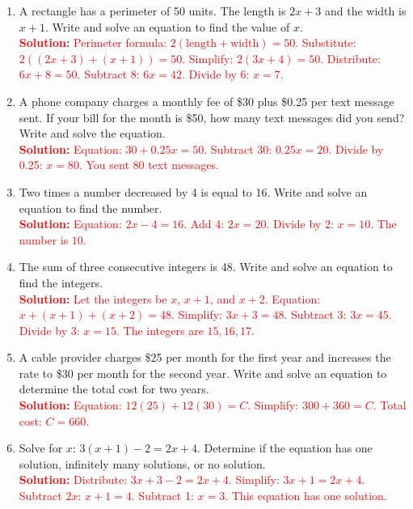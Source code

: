 \documentclass[11pt]{article}
\begin{document}
\begin{tcolorbox}[colframe=black!60, colback=white, 
coltitle=black, colbacktitle=black!15, fonttitle=\bfseries\Large, 
title=Problems, halign title=center, left=10pt, right=10pt, top=10pt, bottom=60pt]
\begin{enumerate}[start=9, itemsep=1em]
    \item A rectangle has a perimeter of 50 units. The length is \(2x + 3\) and the width is \(x + 1\). Write and solve an equation to find the value of \(x\).\\
    \textcolor{red}{\textbf{Solution:} Perimeter formula: \(2(\text{length} + \text{width}) = 50\). Substitute: \(2((2x+3) + (x+1)) = 50\). Simplify: \(2(3x+4) = 50\). Distribute: \(6x + 8 = 50\). Subtract 8: \(6x = 42\). Divide by 6: \(x = 7\).}

    \item A phone company charges a monthly fee of \$30 plus \$0.25 per text message sent. If your bill for the month is \$50, how many text messages did you send? Write and solve the equation.\\
    \textcolor{red}{\textbf{Solution:} Equation: \(30 + 0.25x = 50\). Subtract 30: \(0.25x = 20\). Divide by 0.25: \(x = 80\). You sent 80 text messages.}

    \item Two times a number decreased by 4 is equal to 16. Write and solve an equation to find the number.\\
    \textcolor{red}{\textbf{Solution:} Equation: \(2x - 4 = 16\). Add 4: \(2x = 20\). Divide by 2: \(x = 10\). The number is \(10\).}

    \item The sum of three consecutive integers is 48. Write and solve an equation to find the integers.\\
    \textcolor{red}{\textbf{Solution:} Let the integers be \(x\), \(x+1\), and \(x+2\). Equation: \(x + (x+1) + (x+2) = 48\). Simplify: \(3x + 3 = 48\). Subtract 3: \(3x = 45\). Divide by 3: \(x = 15\). The integers are \(15, 16, 17\).}

    \item A cable provider charges \$25 per month for the first year and increases the rate to \$30 per month for the second year. Write and solve an equation to determine the total cost for two years.\\
    \textcolor{red}{\textbf{Solution:} Equation: \(12(25) + 12(30) = C\). Simplify: \(300 + 360 = C\). Total cost: \(C = 660\).}

    \item Solve for \(x\): \(3(x + 1) - 2 = 2x + 4\). Determine if the equation has one solution, infinitely many solutions, or no solution.\\
    \textcolor{red}{\textbf{Solution:} Distribute: \(3x + 3 - 2 = 2x + 4\). Simplify: \(3x + 1 = 2x + 4\). Subtract \(2x\): \(x + 1 = 4\). Subtract 1: \(x = 3\). This equation has one solution.}
\end{enumerate}
\end{tcolorbox}
\end{document}
